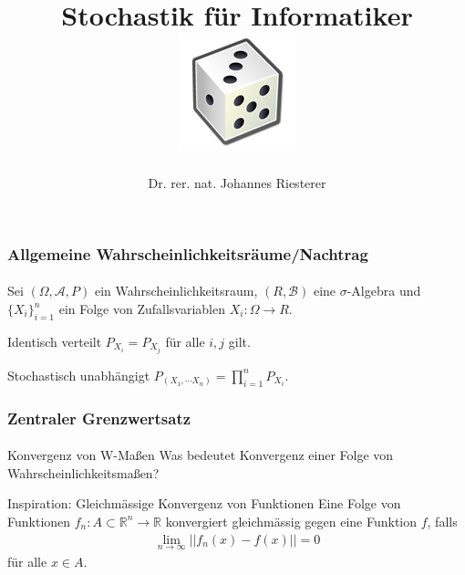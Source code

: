 \documentclass{beamer}
\begin{document}
\title[Stochastik] %
{Stochastik für Informatiker
\\
\includegraphics[scale=0.5]{img/craps}
}
\subtitle{}
\author[Dr. Johannes Riesterer] %
{Dr.  rer. nat. Johannes Riesterer}

\date[KPT 2004] %
{}

\subject{Stochastik}

\frame{\titlepage}


\begin{frame}
    \frametitle{Allgemeine Wahrscheinlichkeitsräume/Nachtrag}
\framesubtitle{}

\begin{block}{}
Sei $(\Omega, \mathcal{A}, P)$ ein Wahrscheinlichkeitsraum, $(R, \mathcal{B})$ eine $\sigma$-Algebra und
 $\{X_i\}_{i=1}^n$ ein Folge von Zufallsvariablen   $X_i :  \Omega \to R$.
\end{block}
\begin{block}{Identisch verteilt}
 $P_{X_i} = P_{X_j}$ für alle $i,j$ gilt.
\end{block}
\begin{block}{Stochastisch unabhängigt}
 $P_{(X_1, \cdots X_n)} = \prod_{i=1}^n P_{X_i}$. 
\end{block}

 \end{frame}



\begin{frame}
    \frametitle{Zentraler Grenzwertsatz}
\framesubtitle{}

\begin{block}{Konvergenz von W-Maßen}
Was bedeutet Konvergenz einer Folge von Wahrscheinlichkeitsmaßen?
\end{block}
\begin{block}{Inspiration: Gleichmässige Konvergenz von Funktionen}
Eine Folge von Funktionen $f_n: A \subset \mathbb{R}^n \to \mathbb{R}$ konvergiert gleichmässig gegen eine Funktion $f$, falls 
\begin{align*}
\lim_{n \to \infty} ||f_n(x) -f(x) || = 0
\end{align*}
für alle $x \in A$.
\end{block}

 \end{frame}
\end{document}
